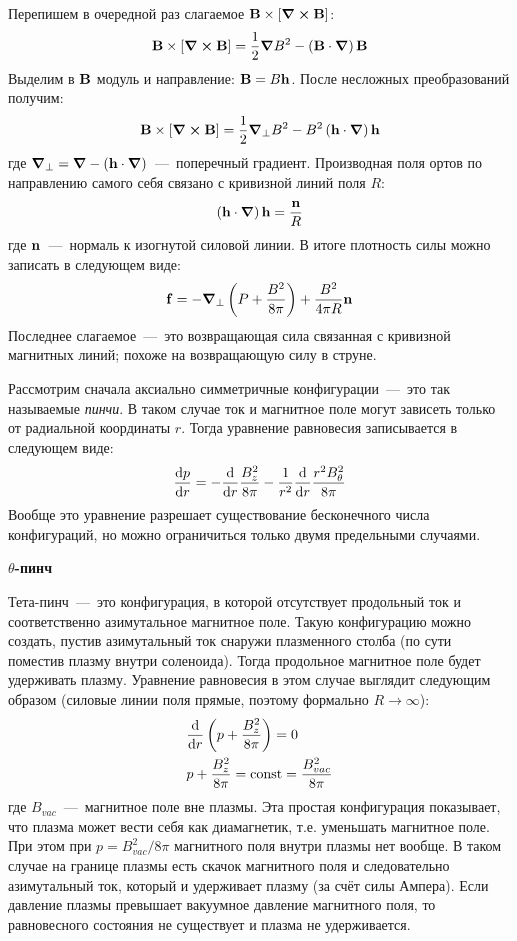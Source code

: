 \documentclass[10pt, a4paper]{article}
\begin{document}
Перепишем в очередной раз слагаемое $\vb{B}\times[\curl{\vb{B}}]$:
\begin{equation*}
	\vb{B}\times[\curl{\vb{B}}] = \frac{1}{2}\grad{B^2} - \left( \vb{B}\cdot\grad \right)\vb{B}
\end{equation*}
Выделим в $\vb{B}$ модуль и направление: $\vb{B} = B\vb{h}$. После несложных преобразований получим:
\begin{equation*}
	\vb{B}\times[\curl{\vb{B}}] = \frac{1}{2}\grad_\perp B^2 - B^2\left( \vb{h}\cdot\grad \right)\vb{h}
\end{equation*}
где $\grad_\perp = \grad - \left( \vb{h}\cdot\grad \right)$~---~поперечный градиент. Производная поля ортов по направлению самого себя связано с кривизной линий поля $R$:
\begin{equation*}
	\left( \vb{h}\cdot\grad \right)\vb{h} = \frac{\vb{n}}{R}
\end{equation*}
где $\vb{n}$~---~нормаль к изогнутой силовой линии.
В итоге плотность силы можно записать в следующем виде:
\begin{equation*}
	\vb{f} = -\grad_\perp\left( P + \frac{B^2}{8\pi} \right) + \frac{B^2}{4\pi R}\vb{n}
\end{equation*}
Последнее слагаемое~---~это возвращающая сила связанная с кривизной магнитных линий; похоже на возвращающую силу в струне.

Рассмотрим сначала аксиально симметричные конфигурации~---~это так называемые \textit{пинчи}. В таком случае ток и магнитное поле могут зависеть только от радиальной координаты $r$. Тогда уравнение равновесия записывается в следующем виде:
\begin{equation*}
	\dv{p}{r} = -\dv{}{r}\frac{B_z^2}{8\pi} - \frac{1}{r^2}\dv{}{r}\frac{r^2 B_\theta^2}{8\pi}
\end{equation*}
Вообще это уравнение разрешает существование бесконечного числа конфигураций, но можно ограничиться только двумя предельными случаями.

\vspace{5mm}
\textbf{$\theta$-пинч}

Тета-пинч~---~это конфигурация, в которой отсутствует продольный ток и соответственно азимутальное магнитное поле. Такую конфигурацию можно создать, пустив азимутальный ток снаружи плазменного столба (по сути поместив плазму внутри соленоида). Тогда продольное магнитное поле будет удерживать плазму. Уравнение равновесия в этом случае выглядит следующим образом (силовые линии поля прямые, поэтому формально $R\rightarrow\infty$):
\begin{align*}
	&\dv{}{r}\left( p + \frac{B_z^2}{8\pi} \right) = 0 \\
	&p + \frac{B_z^2}{8\pi} = \text{const} = \frac{B_{vac}^2}{8\pi}
\end{align*}
где $B_{vac}$~---~магнитное поле вне плазмы. Эта простая конфигурация показывает, что плазма может вести себя как диамагнетик, т.е. уменьшать магнитное поле. При этом при $p = B_{vac}^2/8\pi$ магнитного поля внутри плазмы нет вообще. В таком случае на границе плазмы есть скачок магнитного поля и следовательно азимутальный ток, который и удерживает плазму (за счёт силы Ампера). Если давление плазмы превышает вакуумное давление магнитного поля, то равновесного состояния не существует и плазма не удерживается.
\end{document}
